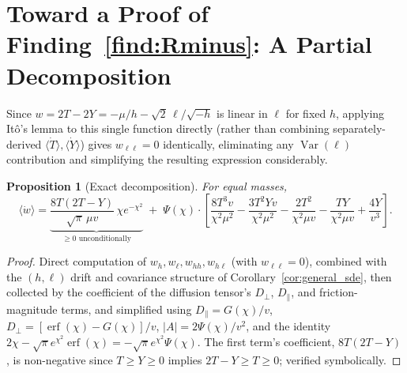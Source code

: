 \documentclass[12pt]{amsart}
\theoremstyle{plain}
\newtheorem{proposition}[theorem]{Proposition}
\theoremstyle{remark}
\begin{document}
\section{Toward a Proof of Finding~\ref{find:Rminus}: A Partial Decomposition}

Since $w=2T-2Y=-\mu/h-\sqrt2\,\ell/\sqrt{-h}$ is linear in $\ell$ for fixed $h$, applying It\^o's lemma to this single function directly (rather than combining separately-derived $\langle\dot T\rangle,\langle\dot Y\rangle$) gives $w_{\ell\ell}=0$ identically, eliminating any $\operatorname{Var}(\ell)$ contribution and simplifying the resulting expression considerably.

\begin{proposition}[Exact decomposition]\label{prop:wdecomp}
For equal masses,
\begin{equation}
\langle\dot w\rangle = \underbrace{\frac{8T(2T-Y)}{\sqrt\pi\,\mu v}\,\chi e^{-\chi^2}}_{\geq0\text{ unconditionally}} \;+\; \Psi(\chi)\cdot\left[\frac{8T^3v}{\chi^2\mu^2}-\frac{3T^2Yv}{\chi^2\mu^2}-\frac{2T^2}{\chi^2\mu v}-\frac{TY}{\chi^2\mu v}+\frac{4Y}{v^3}\right]. \tag{5}
\end{equation}
\end{proposition}

\begin{proof}
Direct computation of $w_h,w_\ell,w_{hh},w_{h\ell}$ (with $w_{\ell\ell}=0$), combined with the $(h,\ell)$ drift and covariance structure of Corollary~\ref{cor:general_sde}, then collected by the coefficient of the diffusion tensor's $D_\perp$, $D_\parallel$, and friction-magnitude terms, and simplified using $D_\parallel=G(\chi)/v$, $D_\perp=[\operatorname{erf}(\chi)-G(\chi)]/v$, $|A|=2\Psi(\chi)/v^2$, and the identity $2\chi-\sqrt\pi e^{\chi^2}\operatorname{erf}(\chi)=-\sqrt\pi e^{\chi^2}\Psi(\chi)$. The first term's coefficient, $8T(2T-Y)$, is non-negative since $T\geq Y\geq0$ implies $2T-Y\geq T\geq0$; verified symbolically.
\end{proof}
\end{document}
